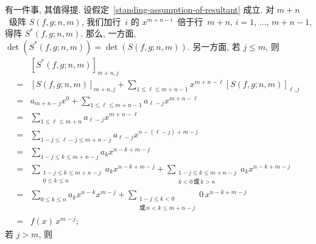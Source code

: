 \documentclass[../libro.tex]{subfiles}
\begin{document}
有一件事, 其值得提.
设假定~\ref{standing-assumption-of-resultant} 成立.
对 \(m + n\)~级阵 \(S(f, g; n, m)\),
我们加行~\(i\) 的 \(x^{m+n-i}\)~倍于行~\(m + n\),
\(i = 1\), \(\dots\), \(m + n - 1\),
得阵 \(S^* (f, g; n, m)\).
那么, 一方面,
\(\det {(S^* (f, g; n, m))} = \det {(S(f, g; n, m))}\).
另一方面, 若 \(j \leq m\), 则
\begin{align*}
    &
    [S^* (f, g; n, m)]_{m+n,j}
    \\
    = {} &
    [S(f, g; n, m)]_{m+n,j}
    + \sum_{1 \leq \ell \leq m+n-1}
    {x^{m+n-\ell} [S(f, g; n, m)]_{\ell,j}}
    \\
    = {} &
    a_{m+n-j} x^0
    + \sum_{1 \leq \ell \leq m+n-1}
    {a_{\ell-j} x^{m+n-\ell}}
    \\
    = {} &
    \sum_{1 \leq \ell \leq m+n}
    {a_{\ell-j} x^{m+n-\ell}}
    \\
    = {} &
    \sum_{1-j \leq \ell-j \leq m+n-j}
    {a_{\ell-j} x^{n-(\ell-j)+m-j}}
    \\
    = {} &
    \sum_{1-j \leq k \leq m+n-j}
    {a_k x^{n-k+m-j}}
    \\
    = {} &
    \sum_{\substack{
            1-j \leq k \leq m+n-j \\
            0 \leq k \leq n
    }}
    {a_k x^{n-k+m-j}}
    +
    \sum_{\substack{
            1-j \leq k \leq m+n-j \\
            k < 0 \,\text{或}\, k > n
    }}
    {a_k x^{n-k+m-j}}
    \\
    = {} &
    \sum_{0 \leq k \leq n}
    {a_k x^{n-k} x^{m-j}}
    +
    \sum_{\substack{
            1-j \leq k < 0 \\
            \text{或}\, n < k \leq m+n-j
    }}
    {0\, x^{n-k+m-j}}
    \\
    = {} &
    f(x)\, x^{m-j};
\end{align*}
若 \(j > m\), 则
\end{document}
